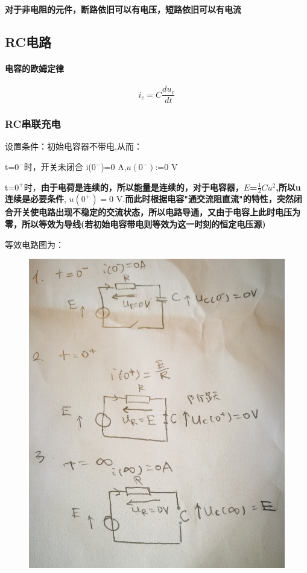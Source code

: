 \documentclass[12pt]{book}
\theoremstyle{definition}\newtheorem{dfn}{Définition}[chapter]
\theoremstyle{plain}\newtheorem{thm}{Théorème}[chapter]
\theoremstyle{plain}\newtheorem{prp}{Proposition}[chapter]
\theoremstyle{plain}\newtheorem{lem}{\bf Lemme}[chapter]
\theoremstyle{plain}\newtheorem{axm}{\bf Axiome}[chapter]
\theoremstyle{plain}\newtheorem{lmm}{\bf Lemme}[chapter]
\theoremstyle{plain}\newtheorem{cor}{\bf Corollaire}[chapter]
\theoremstyle{remark}\newtheorem{rem}{Remarque}[chapter]
\begin{document}
\textbf{对于非电阻的元件，断路依旧可以有电压，短路依旧可以有电流}
\subsection{RC电路}
\paragraph{电容的欧姆定律}
$$
i_c=C\frac{du_c}{dt}
$$



\subsubsection{RC串联充电}
设置条件：初始电容器不带电,从而：

t=$0^-$时，开关未闭合 i($0^-$)=0 A,$u(0^-)$:=0 V

t=$0^+$时，\textbf{由于电荷是连续的，所以能量是连续的，对于电容器，$\mathit{E}$=$\frac{1}{2}Cu^2$,所以u连续是必要条件},
$u(0^+)=0$ V.\textbf{而此时根据电容"通交流阻直流"的特性，突然闭合开关使电路出现不稳定的交流状态，所以电路导通，又由于电容上此时电压为零，所以等效为导线(若初始电容带电则等效为这一时刻的恒定电压源)}

等效电路图为：
\begin{figure}[H]
	\centering
	\includegraphics[scale=0.2]{Circuit lineaire du premier ordre//2}
\end{figure}
\end{document}

